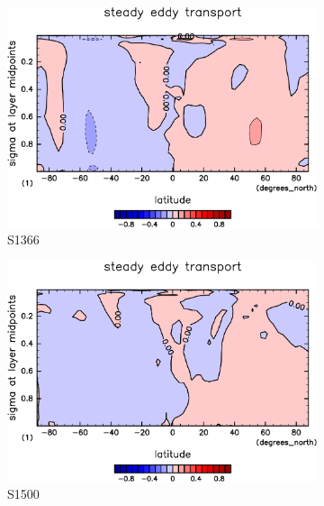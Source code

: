 \documentclass[body]{subfiles}
\begin{document}
\begin{figure}[t]
	\centering
	\begin{subfigure}{.4\textwidth}
		\centering
		\includegraphics[width=\columnwidth]{S1366/MeriHeatTransTest@dryStatEn_SE,time=14600:14965-crop-rotate.pdf}
		\caption{S1366}\label{乾燥静的エネルギー停滞性擾乱S1366}
	\end{subfigure}
	\begin{subfigure}{.4\textwidth}
		\centering
		\includegraphics[width=\columnwidth]{S1500/MeriHeatTransTest@dryStatEn_SE,time=3650:4015-crop-rotate.pdf}
		\caption{S1500}\label{乾燥静的エネルギー停滞性擾乱S1500}
	\end{subfigure}
	\begin{subfigure}{.4\textwidth}
		\centering

\end{subfigure}
\end{figure}
\end{document}
